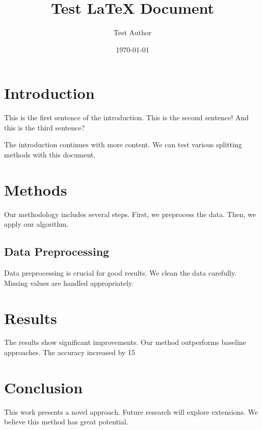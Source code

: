 \documentclass{article}
\title{Test LaTeX Document}
\author{Test Author}
\date{\today}
\begin{document}
\maketitle

\section{Introduction}
This is the first sentence of the introduction. This is the second sentence! And this is the third sentence?

The introduction continues with more content. We can test various splitting methods with this document.

\section{Methods}
Our methodology includes several steps. First, we preprocess the data. Then, we apply our algorithm.

\subsection{Data Preprocessing}
Data preprocessing is crucial for good results. We clean the data carefully. Missing values are handled appropriately.

\section{Results}
The results show significant improvements. Our method outperforms baseline approaches. The accuracy increased by 15%

\section{Conclusion}
This work presents a novel approach. Future research will explore extensions. We believe this method has great potential.
\end{document}
